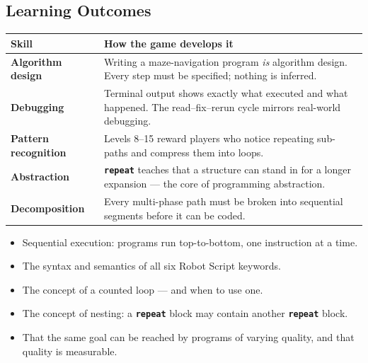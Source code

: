 \documentclass[12pt,a4paper]{article}
\newcommand{\keyword}[1]{\textcolor{keyword}{\texttt{\bfseries #1}}}
\begin{document}
\vspace{6pt}

\subsection{Learning Outcomes}

\begin{tcolorbox}[gddbox, title={Skills Developed}]
\begin{tabularx}{\linewidth}{>{\bfseries\sffamily\color{primary}}p{4cm} X}
  \toprule
  Skill & How the game develops it \\
  \midrule
  Algorithm design & Writing a maze-navigation program \emph{is} algorithm design. Every step must be specified; nothing is inferred. \\[4pt]
  Debugging & Terminal output shows exactly what executed and what happened. The read--fix--rerun cycle mirrors real-world debugging. \\[4pt]
  Pattern recognition & Levels 8--15 reward players who notice repeating sub-paths and compress them into loops. \\[4pt]
  Abstraction & \keyword{repeat} teaches that a structure can stand in for a longer expansion --- the core of programming abstraction. \\[4pt]
  Decomposition & Every multi-phase path must be broken into sequential segments before it can be coded. \\
  \bottomrule
\end{tabularx}
\end{tcolorbox}

\vspace{4pt}

\begin{tcolorbox}[gddbox, title={Knowledge Acquired}]
\begin{itemize}[noitemsep]
  \item Sequential execution: programs run top-to-bottom, one instruction at a time.
  \item The syntax and semantics of all six Robot Script keywords.
  \item The concept of a counted loop --- and when to use one.
  \item The concept of nesting: a \keyword{repeat} block may contain another \keyword{repeat} block.
  \item That the same goal can be reached by programs of varying quality, and that quality is measurable.
\end{itemize}
\end{tcolorbox}
\end{document}
